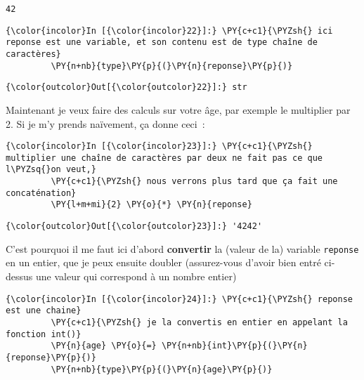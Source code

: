     \begin{Verbatim}[commandchars=\\\{\}]
42

    \end{Verbatim}

    \begin{Verbatim}[commandchars=\\\{\}]
{\color{incolor}In [{\color{incolor}22}]:} \PY{c+c1}{\PYZsh{} ici reponse est une variable, et son contenu est de type chaîne de caractères}
         \PY{n+nb}{type}\PY{p}{(}\PY{n}{reponse}\PY{p}{)}
\end{Verbatim}


\begin{Verbatim}[commandchars=\\\{\}]
{\color{outcolor}Out[{\color{outcolor}22}]:} str
\end{Verbatim}
            
    Maintenant je veux faire des calculs sur votre âge, par exemple le
multiplier par 2. Si je m'y prends naïvement, ça donne ceci~:

    \begin{Verbatim}[commandchars=\\\{\}]
{\color{incolor}In [{\color{incolor}23}]:} \PY{c+c1}{\PYZsh{} multiplier une chaîne de caractères par deux ne fait pas ce que l\PYZsq{}on veut,}
         \PY{c+c1}{\PYZsh{} nous verrons plus tard que ça fait une concaténation}
         \PY{l+m+mi}{2} \PY{o}{*} \PY{n}{reponse}
\end{Verbatim}


\begin{Verbatim}[commandchars=\\\{\}]
{\color{outcolor}Out[{\color{outcolor}23}]:} '4242'
\end{Verbatim}
            
    C'est pourquoi il me faut ici d'abord \textbf{convertir} la (valeur de
la) variable \texttt{reponse} en un entier, que je peux ensuite doubler
(assurez-vous d'avoir bien entré ci-dessus une valeur qui correspond à
un nombre entier)

    \begin{Verbatim}[commandchars=\\\{\}]
{\color{incolor}In [{\color{incolor}24}]:} \PY{c+c1}{\PYZsh{} reponse est une chaine}
         \PY{c+c1}{\PYZsh{} je la convertis en entier en appelant la fonction int()}
         \PY{n}{age} \PY{o}{=} \PY{n+nb}{int}\PY{p}{(}\PY{n}{reponse}\PY{p}{)}
         \PY{n+nb}{type}\PY{p}{(}\PY{n}{age}\PY{p}{)}
\end{Verbatim}


